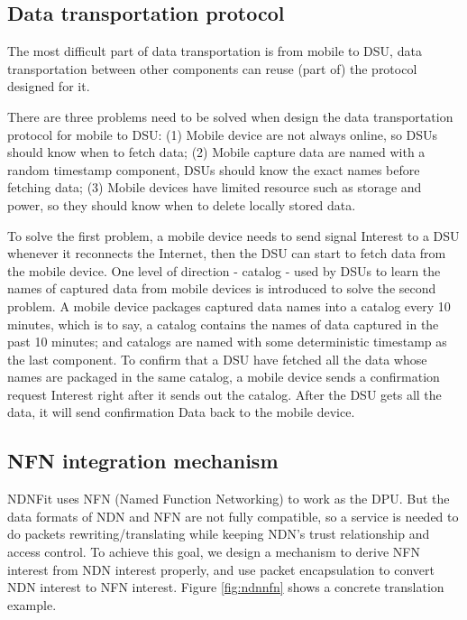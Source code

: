 \documentclass{article}
\begin{document}
\subsection{Data transportation protocol}
\label{sec:data-transportation-protocol}
The most difficult part of data transportation is from mobile to DSU, data transportation between other components can reuse (part of) the protocol designed for it. 

There are three problems need to be solved when design the  data transportation protocol for mobile to DSU: (1) Mobile device are not always online, so DSUs should know when to fetch data; (2) Mobile capture data are named with a random timestamp component, DSUs should know the exact names before fetching data; (3) Mobile devices have limited resource such as storage and power, so they should know when to delete locally stored data.

To solve the first problem, a mobile device needs to send signal Interest to a DSU whenever it reconnects the Internet, then the DSU can start to fetch data from the mobile device.  One level of direction - catalog - used by DSUs to learn the names of captured data from mobile devices is introduced to solve the second problem. A mobile device packages captured data names into a catalog every 10 minutes, which is to say, a catalog contains the names of data captured in the past 10 minutes; and catalogs are named with some deterministic timestamp as the last component. To confirm that a DSU have fetched all the data whose names are packaged in the same catalog, a mobile device sends a confirmation request Interest right after it sends out the catalog. After the DSU gets all the data, it will send confirmation Data back to the mobile device. 

\subsection{NFN integration mechanism}
NDNFit uses NFN (Named Function Networking) to work as the DPU. But the data formats of NDN and NFN are not fully compatible, so a service is needed to do packets rewriting/translating while keeping NDN’s trust relationship and access control. To achieve this goal, we design a mechanism to derive NFN interest from NDN interest properly, and use packet encapsulation to convert NDN interest to NFN interest. Figure \ref{fig:ndnnfn} shows a concrete translation example.
\end{document}
